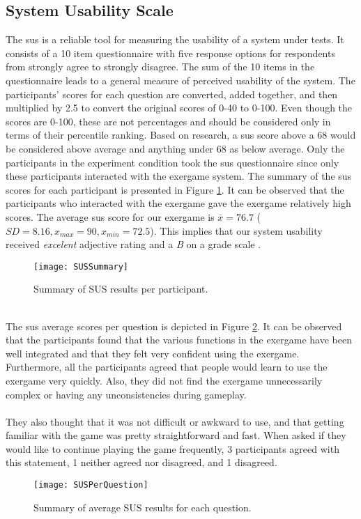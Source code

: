 \subsection{System Usability Scale}
The \acrfull{sus} is a reliable tool for measuring the usability of a system under tests. It consists of a 10 item questionnaire with five response options for respondents from strongly agree to strongly disagree. The sum of the 10 items in the questionnaire leads to a general measure of perceived usability of the system. The participants' scores for each question are converted, added together, and then multiplied by 2.5 to convert the original scores of 0-40 to 0-100. Even though the scores are 0-100, these are not percentages and should be considered only in terms of their percentile ranking. Based on research, a  \acrshort{sus} score above a 68 would be considered above average and anything under 68 as below average. Only the participants in the experiment condition took the \acrshort{sus} questionnaire since only these participants interacted with the exergame system. The summary of the \acrshort{sus} scores for each participant is presented in Figure \ref{fig:sus}. It can be observed that the participants who interacted with the exergame gave the exergame relatively high scores. The  average \acrshort{sus} score for our exergame  is \begin{math}\bar{x} = 76.7 \end{math} (\begin{math} SD = 8.16, x_{max}= 90, x_{min}= 72.5\end{math}). This implies that our system usability received \textit{excelent} adjective rating and a \textit{B} on a grade scale \cite{brooke2013sus}.
\begin{figure}[h]
    \centering
    \texttt{[image: SUSSummary]}
    \caption{Summary of SUS results per participant.}
    \label{fig:sus}
\end{figure}\\
The \acrshort{sus} average scores per question is depicted in Figure \ref{fig:susPerQuestion}. It can be observed that the participants found that the various functions in the exergame have been well integrated and that they felt very confident using the exergame. Furthermore, all the participants agreed that people would learn to use the exergame very quickly. Also, they did not find the exergame unnecessarily complex or having any unconsistencies during gameplay.\\\\ They also thought that it was not difficult or awkward to use, and that getting familiar with the game was pretty straightforward and fast. When asked if they would like to continue playing the game frequently, 3 participants agreed with this statement, 1  neither agreed nor disagreed, and 1 disagreed. \\
\begin{figure}[h]
    \centering
    \texttt{[image: SUSPerQuestion]}
    \caption{Summary of average SUS results for each question.}
    \label{fig:susPerQuestion}
\end{figure}
